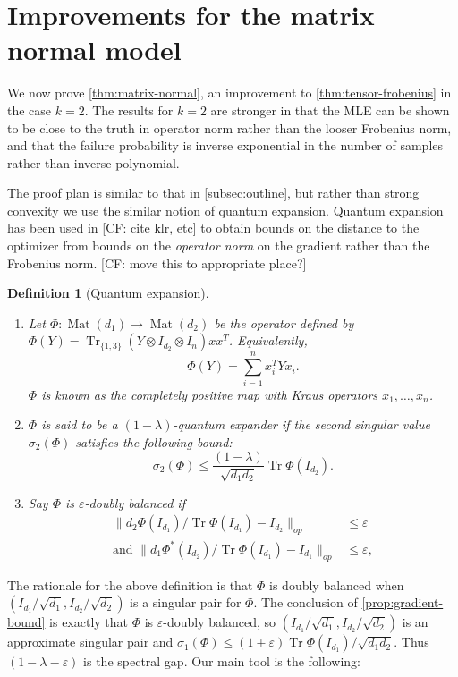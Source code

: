 \documentclass{article}
\newtheorem{definition}{Definition}
\newcommand{\ot}{\otimes}
\newcommand{\mat}{\operatorname{Mat}}
\newcommand\eps{\varepsilon}
\newcommand\samp{x}
\newcommand\tr{\operatorname{Tr}}
\newcommand{\CF}[1]{{\color{purple}[CF: #1]}}
\begin{document}
\section{Improvements for the matrix normal model}\label{sec:matrix-normal}
We now prove \cref{thm:matrix-normal}, an improvement to \cref{thm:tensor-frobenius} in the case $k=2$. The results for $k = 2$ are stronger in that the MLE can be shown to be close to the truth in operator norm rather than the looser Frobenius norm, and that the failure probability is inverse exponential in the number of samples rather than inverse polynomial.




The proof plan is similar to that in \cref{subsec:outline}, but rather than strong convexity we use the similar notion of quantum expansion. Quantum expansion has been used in \CF{cite klr, etc} to obtain bounds on the distance to the optimizer from bounds on the \emph{operator norm} on the gradient rather than the Frobenius norm.
\CF{move this to appropriate place?}
\begin{definition}[Quantum expansion]
$ $
\begin{enumerate}
\item Let $\Phi:\mat(d_1) \to \mat(d_2)$ be the operator defined by $\Phi(Y) = \tr_{\{1,3\}} ( Y \ot I_{d_2} \ot I_{n}) \samp \samp^T$. Equivalently,
$$\Phi(Y) = \sum_{i = 1}^n \samp_i^T Y \samp_i.$$
$\Phi$ is known as the \emph{completely positive map} with Kraus operators $\samp_1, \dots, \samp_n$.
\item $\Phi$ is said to be a \emph{$(1 - \lambda)$-quantum expander} if the second singular value $\sigma_2(\Phi)$ satisfies the following bound:
$$\sigma_2(\Phi) \leq \frac{(1 - \lambda)}{\sqrt{d_1d_2}} \tr \Phi(I_{d_2}).$$
\item Say $\Phi$ is \emph{$\eps$-doubly balanced} if
\begin{align*}
\|d_2 \Phi(I_{d_1})/\tr \Phi(I_{d_1})  - I_{d_2} \|_{op}& \leq \eps\\
\textrm{and }\|d_1 \Phi^*(I_{d_2})/\tr \Phi(I_{d_1})  - I_{d_1}  \|_{op} & \leq \eps,
\end{align*}
\end{enumerate}
\end{definition}

The rationale for the above definition is that $\Phi$ is doubly balanced when $(I_{d_1}/\sqrt{d_1}, I_{d_2}/\sqrt{d_2})$ is a singular pair for $\Phi$. The conclusion of \cref{prop:gradient-bound} is exactly that $\Phi$ is $\eps$-doubly balanced, so $(I_{d_1}/\sqrt{d_1}, I_{d_2}/\sqrt{d_2})$ is an approximate singular pair and $\sigma_1(\Phi) \leq (1+\eps)  \tr \Phi(I_{d_1})/\sqrt{d_1 d_2}$. Thus $(1-\lambda - \eps)$ is the spectral gap.
Our main tool is the following:
\end{document}
